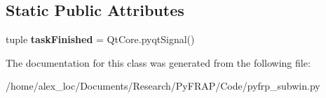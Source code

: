 \subsection*{Static Public Attributes}
\begin{DoxyCompactItemize}
\item 
\hypertarget{classpyfrp__subwin_1_1fitting__thread_a2ef4b0d66377347362787b6c054c8194}{tuple {\bfseries task\+Finished} = Qt\+Core.\+pyqt\+Signal()}\label{classpyfrp__subwin_1_1fitting__thread_a2ef4b0d66377347362787b6c054c8194}

\end{DoxyCompactItemize}


The documentation for this class was generated from the following file\+:\begin{DoxyCompactItemize}
\item 
/home/alex\+\_\+loc/\+Documents/\+Research/\+Py\+F\+R\+A\+P/\+Code/pyfrp\+\_\+subwin.\+py\end{DoxyCompactItemize}
